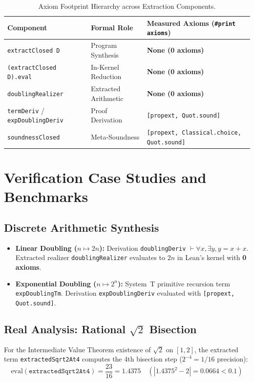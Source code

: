 \documentclass[11pt,a4paper]{article}
\theoremstyle{definition}
\theoremstyle{remark}
\begin{document}
\begin{table}[htbp]
\centering
\begin{tabular}{lll}
\toprule
\textbf{Component} & \textbf{Formal Role} & \textbf{Measured Axioms (\texttt{\#print axioms})} \\
\midrule
\texttt{extractClosed D} & Program Synthesis & \textbf{None (0 axioms)} \\
\texttt{(extractClosed D).eval} & In-Kernel Reduction & \textbf{None (0 axioms)} \\
\texttt{doublingRealizer} & Extracted Arithmetic & \textbf{None (0 axioms)} \\
\texttt{termDeriv} / \texttt{expDoublingDeriv} & Proof Derivation & \texttt{[propext, Quot.sound]} \\
\texttt{soundnessClosed} & Meta-Soundness & \texttt{[propext, Classical.choice, Quot.sound]} \\
\bottomrule
\end{tabular}
\caption{Axiom Footprint Hierarchy across Extraction Components.}
\label{tab:axioms}
\end{table}

\section{Verification Case Studies and Benchmarks}

\subsection{Discrete Arithmetic Synthesis}
\begin{itemize}
    \item \textbf{Linear Doubling ($n \mapsto 2n$):} Derivation \texttt{doublingDeriv} $\vdash \forall x, \exists y, y = x + x$. Extracted realizer \texttt{doublingRealizer} evaluates to $2n$ in Lean's kernel with \textbf{0 axioms}.
    \item \textbf{Exponential Doubling ($n \mapsto 2^n$):} System~T primitive recursion term \texttt{expDoublingTm}. Derivation \texttt{expDoublingDeriv} evaluated with \texttt{[propext, Quot.sound]}.
\end{itemize}

\subsection{Real Analysis: Rational $\sqrt{2}$ Bisection}
For the Intermediate Value Theorem existence of $\sqrt{2}$ on $[1, 2]$, the extracted term \texttt{extractedSqrt2At4} computes the 4th bisection step ($2^{-4} = 1/16$ precision):
\[
\text{eval}(\texttt{extractedSqrt2At4}) = \frac{23}{16} = 1.4375 \quad (|1.4375^2 - 2| = 0.0664 < 0.1)
\]
\end{document}
